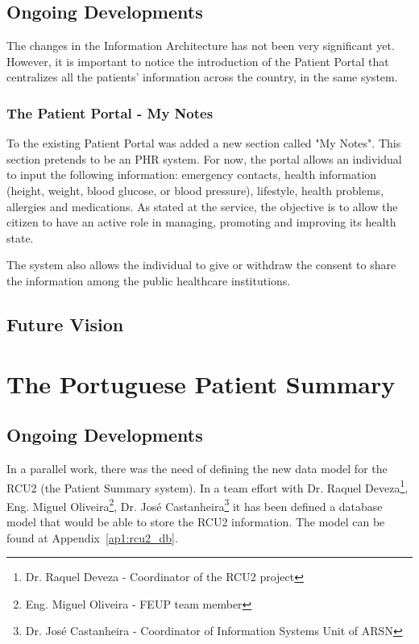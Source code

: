 \subsection{Ongoing Developments}

The changes in the Information Architecture has not been very significant yet. However, it is important to notice the introduction of the Patient Portal that centralizes all the patients' information across the country, in the same system.

\subsubsection{The Patient Portal - My Notes}
To the existing Patient Portal was added a new section called "My Notes". This section pretends to be an PHR system. For now, the portal allows an individual to input the following information: emergency contacts, health information (height, weight, blood glucose, or blood pressure), lifestyle, health problems, allergies and medications. As stated at the service, the objective is to allow the citizen to have an active role in managing, promoting and improving its health state.

The system also allows the individual to give or withdraw the consent to share the information among the public healthcare institutions.

\subsection{Future Vision}




\section{The Portuguese Patient Summary}

\subsection{Ongoing Developments}

In a parallel work, there was the need of defining the new data model for the RCU2 (the Patient Summary system). In a team effort with Dr. Raquel Deveza\footnote{Dr. Raquel Deveza - Coordinator of the RCU2 project}, Eng. Miguel Oliveira\footnote{Eng. Miguel Oliveira - FEUP team member}, Dr. José Castanheira\footnote{Dr. José Castanheira - Coordinator of Information Systems Unit of ARSN} it has been defined a database model that would be able to store the RCU2 information. The model can be found at Appendix~\ref{ap1:rcu2_db}.


